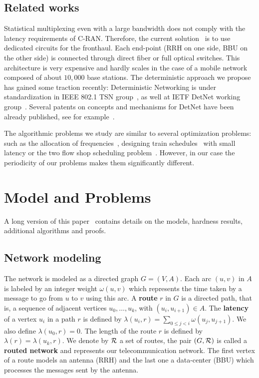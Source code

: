 \documentclass[10pt, conference, letterpaper]{IEEEtran}
\begin{document}
 \subsection*{Related works}

 Statistical multiplexing even with a large bandwidth does not comply with the latency requirements of C-RAN. Therefore, the current solution~\cite{pizzinat2015things,tayq2017real} is to use dedicated circuits for the fronthaul. Each end-point (RRH on one side, BBU on the other side) is connected through direct fiber or full optical switches. This architecture is very expensive and hardly scales in the case of a mobile network composed of about $10,000$ base stations. The deterministic approach we propose has gained some traction recently: Deterministic Networking is under standardization in IEEE 802.1 TSN group~\cite{finn-detnet-architecture-08}, as well at IETF DetNet working group~\cite{ieee802}. Several patents on concepts and mechanisms for DetNet have been already published, see for example~\cite{howe2005time,leclerc2016transmission}. 
     
The algorithmic problems we study are similar to several optimization problems: such as the allocation of frequencies~\cite{borndorfer1998frequency}, designing train schedules~\cite{strotmann2007railway} with small latency or the two flow shop scheduling problem~\cite{yu2004minimizing}. However, in our case the periodicity of our problems makes them significantly different.


\section{Model and Problems}\label{sec:def}

A long version of this paper~\cite{versionlongue} contains details on the models, hardness results, 
additional algorithms and proofs.  

  \subsection{Network modeling}
  

The network is modeled as a directed graph $G=(V,A)$. Each arc  $(u,v)$ in $A$ is labeled by an integer weight $\omega(u,v)$ which represents the time taken by a message to go from $u$ to $v$ using this arc. A {\bf route} $r$ in $G$ is a directed path, that is, a sequence of adjacent vertices $u_0, \ldots , u_{k}$, with $(u_i,u_{i+1}) \in A$.  The {\bf latency} of a vertex $u_i$ in a path $r$ is defined by $\lambda(u_i,r)= \sum\limits_{0 \leq j <i} \omega(u_j, u_{j+1})$. We also define $\lambda(u_0,r)=0$. The length of the route $r$ is defined by $\lambda (r)= \lambda (u_k,r)$.
We denote by $\cal R$ a set of routes, the pair $(G,\cal R)$ is called a {\bf routed network} and represents our telecommunication network.
The first vertex of a route models an antenna (RRH) and the last one a data-center (BBU) which processes the messages sent by the antenna.
\end{document}
